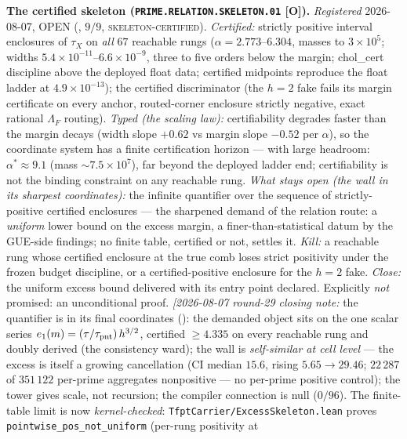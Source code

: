 \documentclass[11pt,a4paper]{article}
\begin{document}
\par\smallskip\noindent\textbf{The certified skeleton
(\texttt{PRIME.RELATION.SKELETON.01} [O]).}
{\sloppy
\emph{Registered} 2026-08-07, OPEN
(, $9/9$,
\textsc{skeleton-certified}).  \emph{Certified:} strictly
positive interval enclosures of $\tau_X$ on \emph{all} $67$
reachable rungs ($\alpha = 2.773$--$6.304$, masses to
$3\times10^5$; widths $5.4\times10^{-11}$--$6.6\times10^{-9}$,
three to five orders below the margin; chol\_cert discipline
above the deployed float data; certified midpoints reproduce the
float ladder at $4.9\times10^{-13}$); the certified discriminator
(the $h = 2$ fake fails its margin certificate on every anchor,
routed-corner enclosure strictly negative, exact rational
$\Lambda_F$ routing).  \emph{Typed (the scaling law):}
certifiability degrades faster than the margin decays (width
slope $+0.62$ vs margin slope $-0.52$ per $\alpha$), so the
coordinate system has a finite certification horizon --- with
large headroom: $\alpha^* \approx 9.1$ (mass
$\sim 7.5\times10^7$), far beyond the deployed ladder end;
certifiability is not the binding constraint on any reachable
rung.  \emph{What stays open (the wall in its sharpest
coordinates):} the infinite quantifier over the sequence of
strictly-positive certified enclosures --- the sharpened demand
of the relation route: a \emph{uniform} lower bound on the excess
margin, a finer-than-statistical datum by the GUE-side findings;
no finite table, certified or not, settles it.  \emph{Kill:} a
reachable rung whose certified enclosure at the true comb loses
strict positivity under the frozen budget discipline, or a
certified-positive enclosure for the $h = 2$ fake.  \emph{Close:}
the uniform excess bound delivered with its entry point declared.
Explicitly \emph{not} promised: an unconditional proof.
\emph{[2026-08-07 round-29 closing note:} the quantifier is in
its final coordinates
(): the demanded object
sits on the one scalar series $e_1(m) =
(\tau/\tau_{\rm pnt})\,h^{3/2}$, certified $\ge 4.335$ on every
reachable rung and doubly derived (the consistency ward); the
wall is \emph{self-similar at cell level} --- the excess is
itself a growing cancellation (CI median $15.6$, rising
$5.65 \to 29.46$; $22\,287$ of $351\,122$ per-prime aggregates
nonpositive --- no per-prime positive control); the tower gives
scale, not recursion; the compiler connection is null ($0/96$).
The finite-table limit is now \emph{kernel-checked}:
\texttt{TfptCarrier/ExcessSkeleton.lean} proves
\texttt{pointwise\_pos\_not\_uniform} (per-rung positivity at
}
\end{document}
